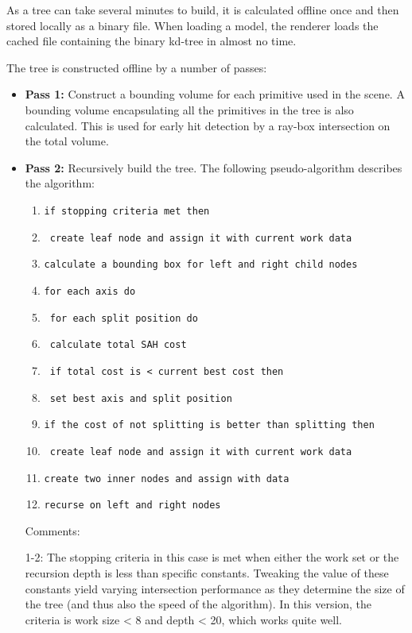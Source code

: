 As a tree can take several minutes to build, it is calculated offline once and then stored locally as a binary file. When loading a model, the renderer loads the cached file containing the binary kd-tree in almost no time.

The tree is constructed offline by a number of passes:
\begin{itemize}
  \item \textbf{Pass 1:} Construct a bounding volume for each primitive used in the scene. A bounding volume encapsulating all the primitives in the tree is also calculated. This is used for early hit detection by a ray-box intersection on the total volume.
  \item \textbf{Pass 2:} Recursively build the tree. The following pseudo-algorithm describes the algorithm:


\begin{enumerate}
	\item \texttt{if stopping criteria met then }
	\item \texttt{  create leaf node and assign it with current work data}
	\item \texttt{calculate a bounding box for left and right child nodes}
	\item \texttt{for each axis do}
	\item \texttt{ for each split position do}
	\item \texttt{   calculate total SAH cost}
	\item \texttt{   if total cost is < current best cost then}
	\item \texttt{     set best axis and split position}
	\item \texttt{if the cost of not splitting is better than splitting then}
	\item \texttt{  create leaf node and assign it with current work data}
	\item \texttt{create two inner nodes and assign with data}
	\item \texttt{recurse on left and right nodes}
\end{enumerate}


  Comments: 

  1-2: The stopping criteria in this case is met when either the work set or the recursion depth is less than specific constants. Tweaking the value of these constants yield varying intersection performance as they determine the size of the tree (and thus also the speed of the algorithm). In this version, the criteria is work size < 8 and depth < 20, which works quite well.


\end{itemize}
